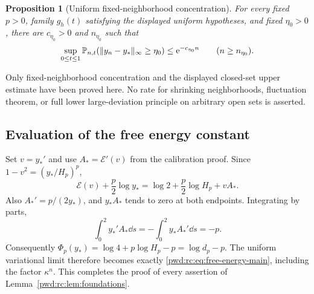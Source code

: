 \documentclass[11pt,letterpaper]{article}
\numberwithin{equation}{section}
\newtheorem{proposition}[theorem]{Proposition}
\theoremstyle{remark}\newtheorem{remark}[theorem]{Remark}
\begin{document}
\begin{proposition}[Uniform fixed-neighborhood concentration]\label{pwd:rc:prop:concentration}
For every fixed $p>0$, family $g_h(t)$ satisfying the displayed uniform hypotheses, and fixed $\eta_0>0$, there are $c_{\eta_0}>0$ and $n_{\eta_0}$ such that
\begin{equation}\label{pwd:rc:eq:concentration}
 \sup_{0\le t\le1}\mathbb P_{n,t}(\|y_n-y_*\|_\infty\ge\eta_0)
 \le\mathrm e^{-c_{\eta_0}n}\qquad(n\ge n_{\eta_0}).
\end{equation}
\end{proposition}
Only fixed-neighborhood concentration and the displayed closed-set upper estimate have been proved here. No rate for shrinking neighborhoods, fluctuation theorem, or full lower large-deviation principle on arbitrary open sets is asserted.


\subsection{Evaluation of the free energy constant}
Set $v=y_*'$ and use $A_*=\mathcal E'(v)$ from the calibration proof. Since $1-v^2=(y_*/H_p)^p$,
\[
 \mathcal E(v)+\frac p2\log y_*
 =\log2+\frac p2\log H_p+v A_*.
\]
Also $A_*'=p/(2y_*)$, and $y_* A_*$ tends to zero at both endpoints. Integrating by parts,
\[
 \int_0^2 y_*' A_*\dd s=-\int_0^2 y_* A_*'\dd s=-p.
\]
Consequently $\Phi_p(y_*)=\log4+p\log H_p-p=\log d_p-p$. The uniform variational limit therefore becomes exactly \eqref{pwd:rc:eq:free-energy-main}, including the factor $\kappa^n$. This completes the proof of every assertion of Lemma~\ref{pwd:rc:lem:foundations}.
\end{document}
